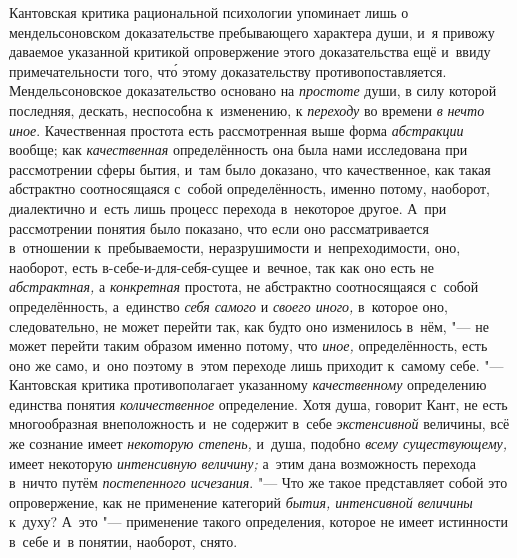 Кантовская критика рациональной психологии упоминает лишь о
мендельсоновском доказательстве пребывающего характера души, и~я привожу
даваемое указанной критикой опровержение этого доказательства ещё и~ввиду
примечательности того, чт\'{о} этому доказательству
противопоставляется.
Мендельсоновское доказательство основано на {\em простоте} души, в
силу которой последняя, дескать, неспособна к~изменению, к
{\em переходу} во времени {\em в} {\em нечто иное}.
Качественная простота есть рассмотренная выше форма
{\em абстракции} вообще; как {\em качественная}
определённость она была нами исследована при рассмотрении
сферы бытия, и~там было доказано, что качественное, как такая абстрактно
соотносящаяся с~собой определённость, именно потому, наоборот, диалектично
и~есть лишь процесс перехода в~некоторое другое. А~при рассмотрении понятия
было показано, что если оно рассматривается в~отношении к~пребываемости,
неразрушимости и~непреходимости, оно, наоборот, есть
в-себе-и-для-себя-сущее и~вечное, так как оно есть не
{\em абстрактная,} а {\em конкретная}
простота, не абстрактно соотносящаяся с~собой определённость,
а~единство {\em себя самого} и {\em своего иного,}
в~которое оно, следовательно, не может перейти так,
как будто оно изменилось в~нём, "--- не может перейти таким
образом именно потому, что {\em иное,}
определённость, есть оно же само, и~оно поэтому в~этом
переходе лишь приходит к~самому себе. "--- Кантовская критика
противополагает указанному {\em качественному}
определению единства понятия {\em количественное}
определение. Хотя душа, говорит Кант, не есть многообразная
внеположность и~не содержит в~себе {\em экстенсивной}
величины, всё же сознание имеет {\em некоторую степень,}
и~душа, подобно {\em всему существующему,} имеет некоторую
{\em интенсивную величину;} а~этим дана возможность перехода в~ничто путём
{\em постепенного исчезания}. "---
Что же такое представляет собой это опровержение, как не
применение категорий {\em бытия, интенсивной величины} к~духу? А~это
"--- применение такого определения, которое не имеет истинности
в~себе и~в понятии, наоборот, снято.

